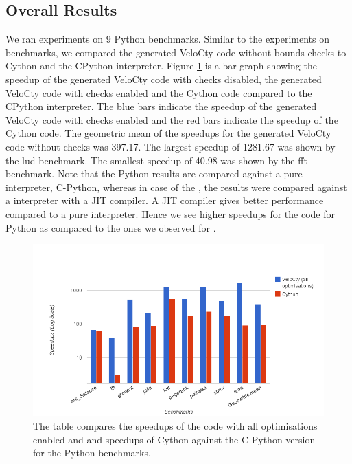 \subsection{Overall Results}
We ran experiments on 9 Python benchmarks. Similar to the experiments on \matlab benchmarks, we compared the generated VeloCty code without bounds checks to Cython and the CPython interpreter. Figure \ref{fig:results_cwochecks_py} is a bar graph showing the speedup of the generated VeloCty code with checks disabled, the generated VeloCty code with checks enabled and the Cython code compared to the CPython interpreter. The blue bars indicate the speedup of the generated VeloCty code with checks enabled and the red bars indicate the speedup of the Cython code. The geometric mean of the speedups for the generated VeloCty code without checks was 397.17. The largest speedup of 1281.67 was shown by the lud benchmark. The smallest speedup of 40.98 was shown by the fft benchmark. Note that the Python results are compared against a pure interpreter, C-Python, whereas in case of the \matlab, the results were compared against a interpreter with a JIT compiler. A JIT compiler gives better performance compared to a pure interpreter. Hence we see higher speedups for the \velocty code for Python as compared to the ones we observed for \matlab. 
\begin{figure}[htbp]
\centering
\includegraphics[scale=0.5]{Figures/results_cwochecks_py.png}
\caption{The table compares the speedups of the \velocty code with all optimisations enabled and and speedups of Cython against the C-Python version for the Python benchmarks.}
\label{fig:results_cwochecks_py}
\end{figure}

